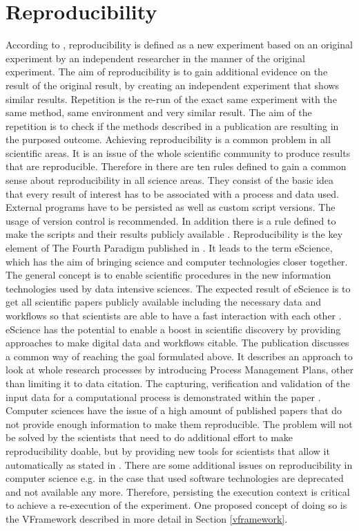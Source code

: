 \documentclass[draft,final]{vutinfth} %
\begin{document}
\section{Reproducibility}\label{Reproducibility}
According to \cite{6064509}, reproducibility is defined as a new experiment based on an original experiment by an independent researcher in the manner of the original experiment. The aim of reproducibility is to gain additional evidence on the result of the original result, by creating an independent experiment that shows similar results. Repetition is the re-run of the exact same experiment with the same method, same environment and very similar result. The aim of the repetition is to check if the methods described in a publication are resulting in the purposed outcome. 
Achieving reproducibility is a common problem in all scientific areas. It is an issue of the whole scientific community to produce results that are reproducible. Therefore in \cite{10.1371/journal.pcbi.1003285} there are ten rules defined to gain a common sense about reproducibility in all science areas. They consist of the basic idea that every result of interest has to be associated with a process and data used. External programs have to be persisted as well as custom script versions. The usage of version control is recommended. In addition there is a rule defined to make the scripts and their results publicly available \cite{10.1371/journal.pcbi.1003285}. 
Reproducibility is the key element of The Fourth Paradigm published in \cite{noauthororeditorfourth}. It leads to the term eScience, which has the aim of bringing science and computer technologies closer together. The general concept is to enable scientific procedures in the new information technologies used by data intensive sciences. The expected result of eScience is to get all scientific papers publicly available including the necessary data and workflows so that scientists are able to have a fast interaction with each other \cite{noauthororeditorfourth}. 
eScience has the potential to enable a boost in scientific discovery by providing approaches to make digital data and workflows citable. The publication \cite{Rauber2015RepeatabilityAR} discusses a common way of reaching the goal formulated above. It describes an approach to look at whole research processes by introducing Process Management Plans, other than limiting it to data citation. The capturing, verification and validation of the input data for a computational process is demonstrated within the paper \cite{Rauber2015RepeatabilityAR}.
Computer sciences have the issue of a high amount of published papers that do not provide enough information to make them reproducible. The problem will not be solved by the scientists that need to do additional effort to make reproducibility doable, but by providing new tools for scientists that allow it automatically as stated in \cite{MIKSA201725}. There are some additional issues on reproducibility in computer science e.g. in the case that used software technologies are deprecated and not available any more. Therefore, persisting the execution context is critical to achieve a re-execution of the experiment. One proposed concept of doing so is the VFramework described in more detail in Section \ref{vframework}. 
\end{document}
